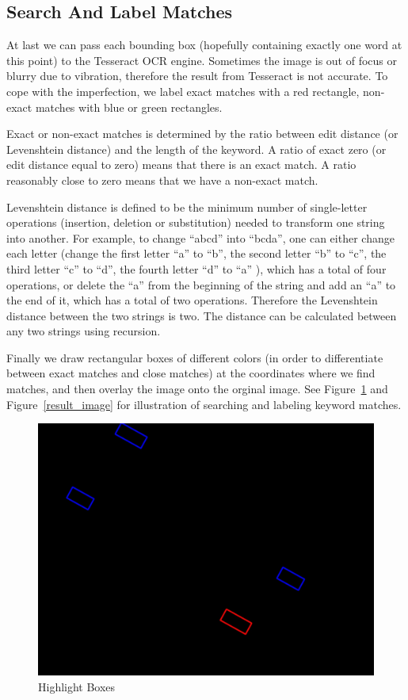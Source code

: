 \documentclass[conference]{IEEEtran}
\begin{document}
\subsection{Search And Label Matches}
At last we can pass each bounding box (hopefully containing exactly one word at this point) to the Tesseract OCR engine.  Sometimes the image is out of focus or blurry due to vibration, therefore the result from Tesseract is not accurate.  To cope with the imperfection, we label exact matches with a red rectangle, non-exact matches with blue or green rectangles.

Exact or non-exact matches is determined by the ratio between edit distance (or Levenshtein distance) and the length of the keyword.  A ratio of exact zero (or edit distance equal to zero) means that there is an exact match.  A ratio reasonably close to zero means that we have a non-exact match.

Levenshtein distance is defined to be the minimum number of single-letter operations (insertion, deletion or substitution) needed to transform one string into another.  For example, to change ``abcd'' into ``bcda'', one can either change each letter (change the first letter ``a'' to ``b'', the second letter ``b'' to ``c'', the third letter ``c'' to ``d'', the fourth letter ``d'' to ``a'' ), which has a total of four operations, or delete the ``a'' from the beginning of the string and add an ``a'' to the end of it, which has a total of two operations.  Therefore the Levenshtein distance between the two strings is two.  The distance can be calculated between any two strings using recursion.

Finally we draw rectangular boxes of different colors (in order to differentiate between exact matches and close matches) at the coordinates where we find matches, and then overlay the image onto the orginal image.  See Figure~\ref{boxes_overlay} and Figure~\ref{result_image} for illustration of searching and labeling keyword matches.

\begin{figure}
\center
\includegraphics[scale=0.15]{bb_mask_inv_cropped.jpg}
\caption{Highlight Boxes}
\label{boxes_overlay}
\end{figure}
\end{document}

